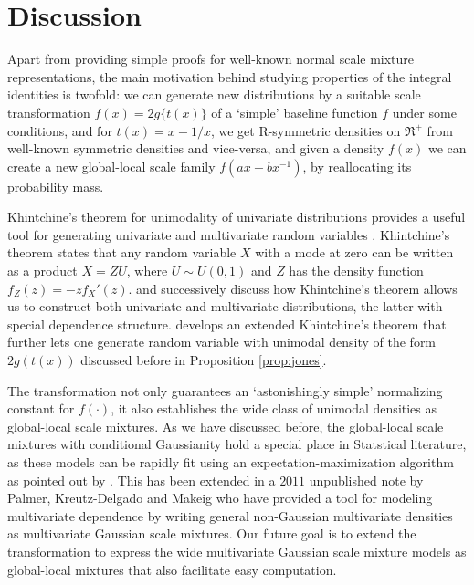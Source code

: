 \documentclass[letterpaper,11pt]{article}
\begin{document}
\section{Discussion}

Apart from providing simple proofs for well-known normal scale mixture representations, the main motivation behind studying properties of the integral identities is twofold: we can generate new distributions by a suitable scale transformation $f(x) = 2g\{ t(x) \}$ of a `simple' baseline function $f$ under some conditions, and for $t(x) = x - 1/x$, we get R-symmetric densities on $\Re^+$ from well-known symmetric densities and vice-versa, and given a density $f(x)$ we can create a new global-local scale family $f(ax-bx^{-1})$, by reallocating its probability mass. 

Khintchine's theorem for unimodality of univariate distributions provides a useful tool for generating univariate and multivariate random variables \citep{bryson1982constructing}. Khintchine's theorem states that any random variable $X$ with a mode at zero can be written as a product $X = ZU$, where $U \sim U(0,1)$ and $Z$ has the density function $f_Z(z) = -zf_{X}'(z)$. \citep{bryson1982constructing} and successively \cite{jones2010distributions,jones2012khintchine} discuss how Khintchine's theorem allows us to construct both univariate and multivariate distributions, the latter with special dependence structure. \cite{jones2014generating} develops an extended Khintchine's theorem that further lets one generate random variable with unimodal density of the form $2g(t(x))$ discussed before in Proposition \ref{prop:jones}. 

The \CS transformation not only guarantees an `astonishingly simple' normalizing constant for $f(\cdot)$, it also establishes the wide class of unimodal densities as global-local scale mixtures. As we have discussed before, the global-local scale mixtures with conditional Gaussianity hold a special place in Statstical literature, as these models can be rapidly fit using an expectation-maximization algorithm as pointed out by \cite{polson2013data}. This has been extended in a $2011$ unpublished note by Palmer, Kreutz-Delgado and Makeig who have provided a tool for modeling multivariate dependence by writing general non-Gaussian multivariate densities as multivariate Gaussian scale mixtures. Our future goal is to extend the \CS transformation to express the wide multivariate Gaussian scale mixture models as global-local mixtures that also facilitate easy computation. \par
\end{document}
